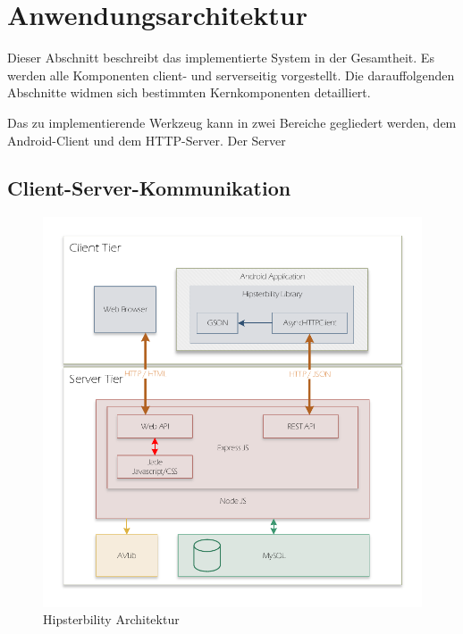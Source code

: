 \section{Anwendungsarchitektur}
\label{app_architecture}
Dieser Abschnitt beschreibt das implementierte System in der Gesamtheit. Es werden alle Komponenten client- und serverseitig vorgestellt. Die darauffolgenden Abschnitte widmen sich bestimmten Kernkomponenten detailliert. 

Das zu implementierende Werkzeug kann in zwei Bereiche gegliedert werden, dem Android-Client und dem HTTP-Server. Der Server

\subsection{Client-Server-Kommunikation}

\begin{figure}[h]
	\label{img:architecture}
	\includegraphics[width=\linewidth]{img/architecture}
	\caption{Hipsterbility Architektur}
\end{figure}


